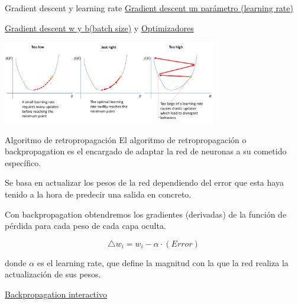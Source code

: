 \begin{frame}{Gradient descent y learning rate}
\href{https://www.deeplearning.ai/ai-notes/optimization/index.html\#learning-rate}{Gradient descent un parámetro (learning rate)}

\href{https://www.deeplearning.ai/ai-notes/optimization/index.html\#adjusting-gradient-descent-hyperparameters}{Gradient descent w y b(batch size)} y \href{https://www.deeplearning.ai/ai-notes/optimization/index.html\#iterative-update}{Optimizadores}

\centering
\includegraphics[width=0.7\textwidth]{Slides/figures/Introduccion/lr.png}

\end{frame}

\begin{frame}{Algoritmo de retropropagación}
El algoritmo de \alert{retropropagación} o \alert{backpropagation} es el encargado de \alert{adaptar} la red de neuronas a su cometido específico.

Se basa en actualizar los \alert{pesos} de la red dependiendo del \alert{error} que esta haya tenido a la hora de predecir una \alert{salida} en concreto.

Con backpropagation obtendremos los \alert{gradientes (derivadas)} de la función de pérdida
para cada \alert{peso} de cada \alert{capa oculta}.

\begin{equation}
    \bigtriangleup w_i = w_i - \alpha \cdot (Error)
\end{equation}

donde $\alpha$ es el \alert{learning rate}, que define la \alert{magnitud} con la que la red realiza la \alert{actualización} de sus pesos.

\href{https://xnought.github.io/backprop-explainer/}{Backpropagation interactivo}

\end{frame}


